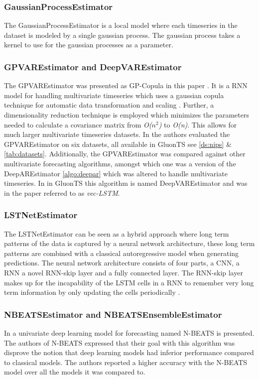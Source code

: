 \subsubsection{GaussianProcessEstimator}
The GaussianProcessEstimator is a local model where each timeseries in the dataset is modeled by a single gaussian process. The gaussian process takes a kernel to use for the gaussian processes as a parameter. 
\cite{gluonts-website}

\subsubsection{GPVAREstimator and DeepVAREstimator}
\label{algo:gpvar}
The GPVAREstimator was presented as GP-Copula in this paper \cite{salinas_high-dimensional_2019}. It is a RNN model for handling multivariate timeseries which uses a gaussian copula technique for automatic data transformation and scaling . Further, a dimensionality reduction technique is employed which minimizes the parameters needed to calculate a covariance matrix from \textit{O($n^2$)} to \textit{O(n)}. This allows for much larger multivariate timeseries datasets. In \cite{salinas_high-dimensional_2019} the authors evaluated the GPVAREstimator on six datasets, all available in GluonTS see \ref{ds:nips} \& \ref{tab:datasets}. Additionally, the GPVAREstimator was compared against other multivariate forecasting algorithms, amongst which one was a version of the DeepAREstimator \ref{algo:deepar} which was altered to handle multivariate timeseries. In in GluonTS this algorithm is named DeepVAREstimator and was in the paper referred to as \textit{vec-LSTM}. 

\subsubsection{LSTNetEstimator}
The LSTNetEstimator can be seen as a hybrid approach where long term patterns of the data is captured by a neural network architecture, these long term patterns are combined with a classical autoregressive model when generating predictions. The neural network architecture consists of four parts, a CNN, a RNN a novel RNN-skip layer and a fully connected layer. The RNN-skip layer makes up for the incapability of the LSTM cells in a RNN to remember very long term information by only updating the cells periodically \cite{lai_modeling_2018}.

\subsubsection{NBEATSEstimator and NBEATSEnsembleEstimator}
In \cite{oreshkin_n-beats_2020} a univariate deep learning model for forecasting named N-BEATS is presented. The authors of N-BEATS expressed that their goal with this algorithm was disprove the notion that deep learning models had inferior performance  compared to classical models. The authors reported a higher accuracy with the N-BEATS model over all the models it was compared to. 

